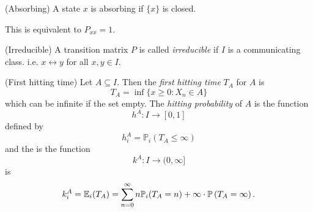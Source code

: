 \documentclass{article}
\begin{document}
\begin{definition}
	(Absorbing) A state $ x $ is absorbing if $ \{x\} $ is closed.
\end{definition}
This is equivalent to $ P_{xx}=1 $.
\begin{definition}
	(Irreducible) A transition matrix $ P $ is called \textit{irreducible} if $ I $ is a communicating class. i.e. $ x\longleftrightarrow y $ for all $ x,y\in I $.
\end{definition}
\begin{definition}
	(First hitting time) Let $ A\subseteq I $. Then the \textit{first hitting time} $ T_A $ for $ A $ is 
	\[
		T_A=\inf\{x\ge 0: X_n\in A\}
	\]
	which can be infinite if the set empty. The \textit{hitting probability} of $ A $ is the function 
	\[
		h^A:I\to [0,1]
	\]
	defined by
	\[
	  h_i^A=\mathbb P_i(T_A\le \infty)
	\]
	and the  is the function
	\[
		k^A:I\to(0,\infty]
	\]
	is
	\[
		k^A_i=\mathbb E_i(T_A)=\sum_{n=0}^\infty n\mathbb P_i(T_A=n)+\infty\cdot\mathbb{P}\left({T_A=\infty}\right).
	\]
\end{definition}
\end{document}
